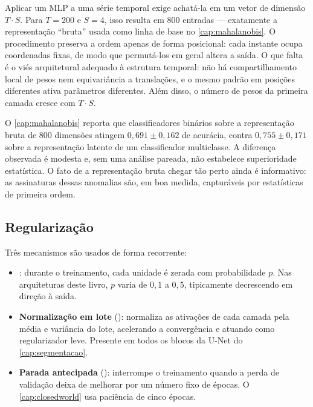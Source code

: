 Aplicar um MLP a uma série temporal exige achatá-la em um vetor de dimensão $T \cdot S$.
Para $T = 200$ e $S = 4$, isso resulta em \num{800} entradas --- exatamente a
representação ``bruta'' usada como linha de base no \cref{cap:mahalanobis}. O
procedimento preserva a ordem apenas de forma posicional: cada instante ocupa
coordenadas fixas, de modo que permutá-los em geral altera a saída. O que falta é o
viés arquitetural adequado à estrutura temporal: não há compartilhamento local de
pesos nem equivariância a translações, e o mesmo padrão em posições diferentes ativa
parâmetros diferentes. Além disso, o número de pesos da primeira camada cresce com
$T \cdot S$.

\begin{destaque}
O \cref{cap:mahalanobis} reporta que classificadores binários sobre a representação
bruta de \num{800} dimensões atingem $0{,}691 \pm 0{,}162$ de acurácia, contra
$0{,}755 \pm 0{,}171$ sobre a representação latente de um classificador multiclasse. A
diferença observada é modesta e, sem uma análise pareada, não estabelece superioridade
estatística. O fato de a representação bruta chegar tão perto ainda é informativo: as
assinaturas dessas anomalias são, em boa medida, capturáveis por
estatísticas de primeira ordem.
\end{destaque}

\subsection{Regularização}

Três mecanismos são usados de forma recorrente:

\begin{itemize}[leftmargin=*,itemsep=0.3em]
  \item \textbf{} \citep{srivastava14a}: durante o treinamento, cada
        unidade é zerada com probabilidade $p$. Nas arquiteturas deste livro, $p$ varia
        de $0{,}1$ a $0{,}5$, tipicamente decrescendo em direção à saída.
  \item \textbf{Normalização em lote} (): normaliza as ativações
        de cada camada pela média e variância do lote, acelerando a convergência e
        atuando como regularizador leve. Presente em todos os blocos da U-Net do
        \cref{cap:segmentacao}.
  \item \textbf{Parada antecipada} (): interrompe o treinamento
        quando a perda de validação deixa de melhorar por um número fixo de épocas.
        O \cref{cap:closedworld} usa paciência de cinco épocas.
\end{itemize}

